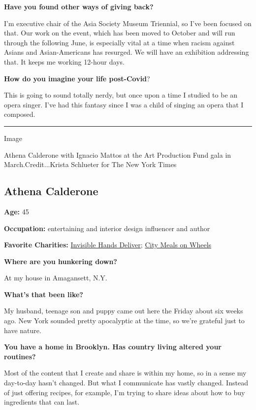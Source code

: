 \textbf{Have you found other ways of giving back?}

I'm executive chair of the Asia Society Museum Triennial, so I've been
focused on that. Our work on the event, which has been moved to October
and will run through the following June, is especially vital at a time
when racism against Asians and Asian-Americans has resurged. We will
have an exhibition addressing that. It keeps me working 12-hour days.

\textbf{How do you imagine your life post-Covid}?

This is going to sound totally nerdy, but once upon a time I studied to
be an opera singer. I've had this fantasy since I was a child of singing
an opera that I composed.

\begin{center}\rule{0.5\linewidth}{\linethickness}\end{center}

Image

Athena Calderone with Ignacio Mattos at the Art Production Fund gala in
March.Credit...Krista Schlueter for The New York Times

\hypertarget{athena-calderone}{%
\subsection{Athena Calderone}\label{athena-calderone}}

\textbf{Age:} 45

\textbf{Occupation:} entertaining and interior design influencer and
author

\textbf{Favorite Charities:}
\href{https://invisiblehandsdeliver.org}{Invisible Hands Deliver};
\href{https://www.citymeals.org}{City Meals on Wheels}

\textbf{Where are you hunkering down?}

At my house in Amagansett, N.Y.

\textbf{What's that been like?}

My husband, teenage son and puppy came out here the Friday about six
weeks ago. New York sounded pretty apocalyptic at the time, so we're
grateful just to have nature.

\textbf{You have a home in Brooklyn. Has country living altered your
routines?}

Most of the content that I create and share is within my home, so in a
sense my day-to-day hasn't changed. But what I communicate has vastly
changed. Instead of just offering recipes, for example, I'm trying to
share ideas about how to buy ingredients that can last.

